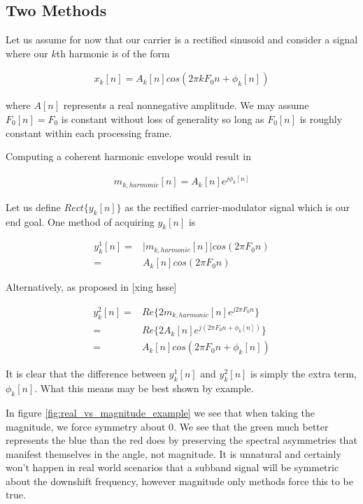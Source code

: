\documentclass [11pt, proquest] {uwthesis}[2015/03/03]
\begin{document}
\subsection{Two Methods}

Let us assume for now that our carrier is a rectified sinusoid and consider a signal where our $k$th harmonic is of the form

\begin{align}
x_k[n] = A_k[n]cos(2\pi kF_0n + \phi_k[n])
\end{align}

where $A[n]$ represents a real nonnegative amplitude.  We may assume $F_0[n] = F_0$ is constant without loss of generality so long as $F_0[n]$ is roughly constant within each processing frame.

Computing a coherent harmonic envelope would result in

\begin{align}
m_{k,harmonic}[n] = A_k[n]e^{j\phi_k[n]}
\end{align}

Let us define $Rect\{y_k[n]\}$ as the rectified carrier-modulator signal which is our end goal.  One method of acquiring $y_k[n]$ is

\begin{align}
\label{eq:realVSmag1}
y_k^1[n] =& \vert m_{k,harmonic}[n] \vert cos(2\pi F_0 n) \\
=& A_k[n] cos(2\pi F_0 n) \nonumber
\end{align}

Alternatively, as proposed in [xing hsse]

\begin{align}
y_k^2[n] =& Re\{ 2m_{k,harmonic}[n] e^{j2\pi F_0 n} \}  \\
=& Re\{ 2A_k[n]e^{j(2\pi F_0 n + \phi_k[n])} \} \nonumber \\
=& A_k[n]cos(2\pi F_0 n + \phi_k[n]) \nonumber
\end{align}

It is clear that the difference between $y_k^1[n]$ and $y_k^2[n]$ is simply the extra term, $\phi_k[n]$.  What this means may be best shown by example.

In figure \ref{fig:real_vs_magnitude_example} we see that when taking the magnitude, we force symmetry about $0$.  We see that the green much better represents the blue than the red does by preserving the spectral asymmetries that manifest themselves in the angle, not magnitude.  It is unnatural and certainly won't happen in real world scenarios that a subband signal will be symmetric about the downshift frequency, however magnitude only methods force this to be true.
\end{document}

